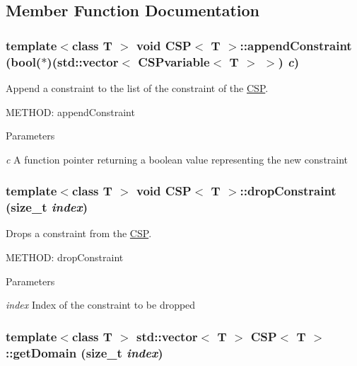 \subsection{Member Function Documentation}
\hypertarget{classCSP_a8dc6aec6ca7e40d198e58b0ec14fee66}{
\subsubsection[{appendConstraint}]{\setlength{\rightskip}{0pt plus 5cm}template$<$class T $>$ void {\bf CSP}$<$ T $>$::appendConstraint (bool($\ast$)(std::vector$<$ {\bf CSPvariable}$<$ T $>$ $>$) {\em c})}}
\label{classCSP_a8dc6aec6ca7e40d198e58b0ec14fee66}


Append a constraint to the list of the constraint of the \hyperlink{classCSP}{CSP}. 

METHOD: appendConstraint 
\begin{DoxyParams}{Parameters}
\item[{\em c}]A function pointer returning a boolean value representing the new constraint \end{DoxyParams}
\hypertarget{classCSP_a0231b93bceae257f0e1c35041f8fe63f}{
\subsubsection[{dropConstraint}]{\setlength{\rightskip}{0pt plus 5cm}template$<$class T $>$ void {\bf CSP}$<$ T $>$::dropConstraint (size\_\-t {\em index})}}
\label{classCSP_a0231b93bceae257f0e1c35041f8fe63f}


Drops a constraint from the \hyperlink{classCSP}{CSP}. 

METHOD: dropConstraint 
\begin{DoxyParams}{Parameters}
\item[{\em index}]Index of the constraint to be dropped \end{DoxyParams}
\hypertarget{classCSP_a2a9a7d8072613f6984795d5495373847}{
\subsubsection[{getDomain}]{\setlength{\rightskip}{0pt plus 5cm}template$<$class T $>$ std::vector$<$ T $>$ {\bf CSP}$<$ T $>$::getDomain (size\_\-t {\em index})}}
\label{classCSP_a2a9a7d8072613f6984795d5495373847}


